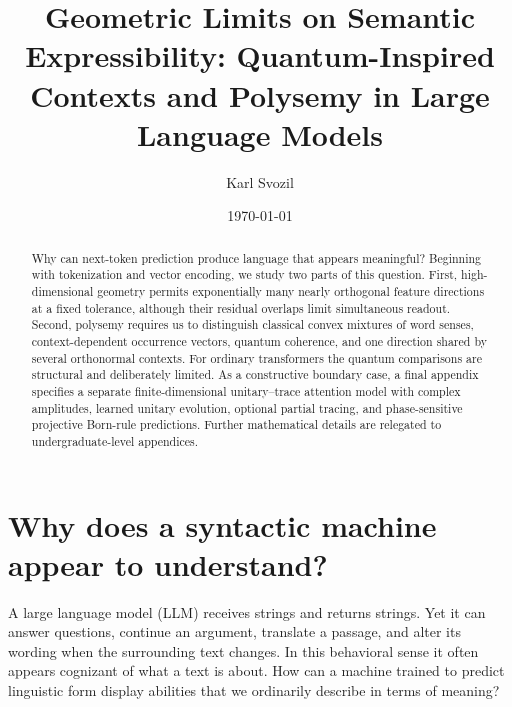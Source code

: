 \documentclass[
  aps,
  reprint,
  superscriptaddress,
  floatfix,
  nofootinbib,
  longbibliography
]{revtex4-2}
\begin{document}
\title{Geometric Limits on Semantic Expressibility: Quantum-Inspired Contexts and Polysemy in Large Language Models}

\author{Karl Svozil}

\date{\today}

\begin{abstract}
Why can next-token prediction produce language that appears meaningful?
Beginning with tokenization and vector encoding, we study two parts of this
question.  First, high-dimensional geometry permits exponentially many nearly
orthogonal feature directions at a fixed tolerance, although their residual
overlaps limit simultaneous readout.  Second, polysemy requires us to
distinguish classical convex mixtures of word senses, context-dependent
occurrence vectors, quantum coherence, and one direction shared by several
orthonormal contexts.  For ordinary transformers the quantum comparisons are
structural and deliberately limited.  As a constructive boundary case, a
final appendix specifies a separate finite-dimensional unitary--trace
attention model with complex amplitudes, learned unitary evolution, optional
partial tracing, and phase-sensitive projective Born-rule predictions.
Further mathematical details are
relegated to undergraduate-level appendices.
\end{abstract}

\maketitle

\section{Why does a syntactic machine appear to understand?}
\label{sec:puzzle}

A large language model (LLM) receives strings and returns strings.  Yet it can
answer questions, continue an argument, translate a passage, and alter its
wording when the surrounding text changes.  In this behavioral sense it often
appears cognizant of what a text is about.  How can a machine trained to
predict linguistic form display abilities that we ordinarily describe in
terms of meaning?
\end{document}
